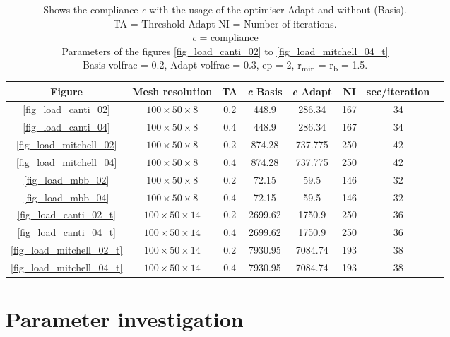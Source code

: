 \begin{table}[!h]
\begin{tabular}{|c|c|c|c|c|c|c|c|}
\hline 
\rowcolor{Green}
Figure & Mesh resolution & TA & \emph{c} Basis &
\emph{c} Adapt& NI & sec/iteration \\ 
\hline 
\ref{fig_load_canti_02} &$100\times 50 \times 8$&0.2& 448.9 &286.34 &  167& 34 \\ 
\hline 
\ref{fig_load_canti_04} &$100\times 50 \times 8$&0.4& 448.9&  286.34 & 167 & 34 \\ 
\hline 
\ref{fig_load_mitchell_02}  &$100\times 50 \times 8$& 0.2&874.28 &  737.775 & 250 & 42 \\ 
\hline 
\ref{fig_load_mitchell_04} &$100\times 50 \times 8$& 0.4 &874.28 &  737.775  & 250 & 42 \\ 
\hline 
\ref{fig_load_mbb_02} &$100\times 50 \times 8$& 0.2&72.15& 59.5 & 146 & 32 \\ 
\hline 
\ref{fig_load_mbb_04} &$100\times 50 \times 8$&0.4&72.15 &  59.5 & 146 & 32 \\ 
\hline 
\ref{fig_load_canti_02_t}  &$100\times 50 \times 14$&0.2& 2699.62&1750.9 & 250 & 36 \\ 
\hline 
\ref{fig_load_canti_04_t} &$100\times 50 \times 14$&0.4&2699.62& 1750.9 & 250 & 36 \\ 
\hline 
\ref{fig_load_mitchell_02_t} &$100\times 50 \times 14$& 0.2 & 7930.95 & 7084.74 & 193 & 38 \\ 
\hline 
\ref{fig_load_mitchell_04_t} &$100\times 50 \times 14$& 0.4&7930.95& 7084.74 & 193 & 38 \\ 
\hline 
\end{tabular} 
\caption{Shows the compliance \emph{c} with the usage of the optimiser Adapt and without (Basis).\\
TA = Threshold Adapt
NI = Number of iterations.\\
\emph{c} = compliance\\
Parameters of the figures \protect\ref{fig_load_canti_02} to \protect\ref{fig_load_mitchell_04_t}\\
Basis-volfrac = 0.2, Adapt-volfrac = 0.3, ep = 2, r\textsubscript{min} = r\textsubscript{b} = 1.5.
}
\label{tabe_3d_load_cases}
\end{table}

\section{Parameter investigation}

